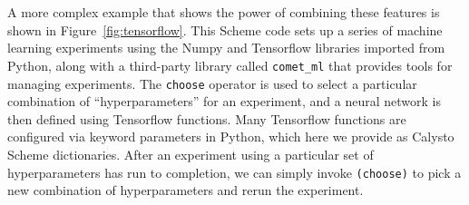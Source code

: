 \documentclass[acmsmall,screen,authorversion]{acmart}
\begin{document}
\noindent
\\\\A more complex example that shows the power of combining these features is
shown in Figure~\ref{fig:tensorflow}. This Scheme code sets up a series of
machine learning experiments using the Numpy and Tensorflow libraries imported
from Python, along with a third-party library called \texttt{comet\_ml} that
provides tools for managing experiments.  The \texttt{choose} operator is used
to select a particular combination of ``hyperparameters'' for an experiment,
and a neural network is then defined using Tensorflow functions.  Many
Tensorflow functions are configured via keyword parameters in Python, which
here we provide as Calysto Scheme dictionaries.  After an experiment using a
particular set of hyperparameters has run to completion, we can simply invoke
\texttt{(choose)} to pick a new combination of hyperparameters and rerun the
experiment.

\end{document}
